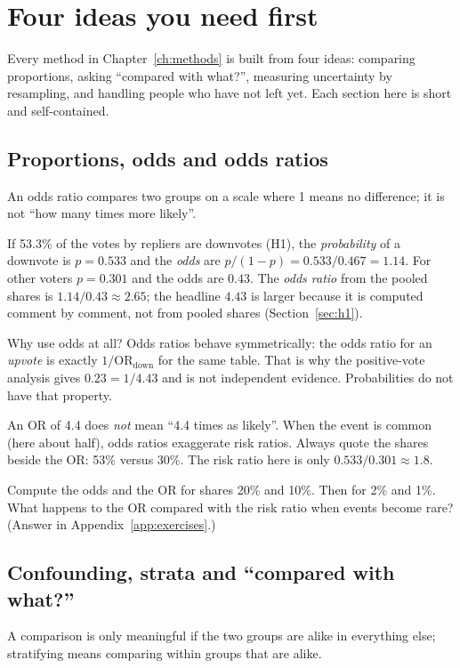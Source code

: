 \chapter{Four ideas you need first}\label{ch:primer}

Every method in Chapter~\ref{ch:methods} is built from four ideas: comparing proportions, asking ``compared with what?'', measuring uncertainty by resampling, and handling people who have not left yet. Each section here is short and self-contained.

\section{Proportions, odds and odds ratios}
\begin{idea}
An odds ratio compares two groups on a scale where 1 means no difference; it is not ``how many times more likely''.
\end{idea}

If 53.3\% of the votes by repliers are downvotes (H1), the \emph{probability} of a downvote is $p=0.533$ and the \emph{odds} are $p/(1-p) = 0.533/0.467 = 1.14$. For other voters $p=0.301$ and the odds are $0.43$. The \emph{odds ratio} from the pooled shares is $1.14/0.43\approx 2.65$; the headline $4.43$ is larger because it is computed comment by comment, not from pooled shares (Section~\ref{sec:h1}).

Why use odds at all? Odds ratios behave symmetrically: the odds ratio for an \emph{upvote} is exactly $1/\text{OR}_{\text{down}}$ for the same table. That is why the positive-vote analysis gives $0.23=1/4.43$ and is not independent evidence. Probabilities do not have that property.

\begin{pitfall}
An OR of 4.4 does \emph{not} mean ``4.4 times as likely''. When the event is common (here about half), odds ratios exaggerate risk ratios. Always quote the shares beside the OR: 53\% versus 30\%. The risk ratio here is only $0.533/0.301\approx1.8$.
\end{pitfall}

\begin{tryit}
Compute the odds and the OR for shares 20\% and 10\%. Then for 2\% and 1\%. What happens to the OR compared with the risk ratio when events become rare? (Answer in Appendix~\ref{app:exercises}.)
\end{tryit}

\section{Confounding, strata and ``compared with what?''}
\begin{idea}
A comparison is only meaningful if the two groups are alike in everything else; stratifying means comparing within groups that are alike.
\end{idea}

